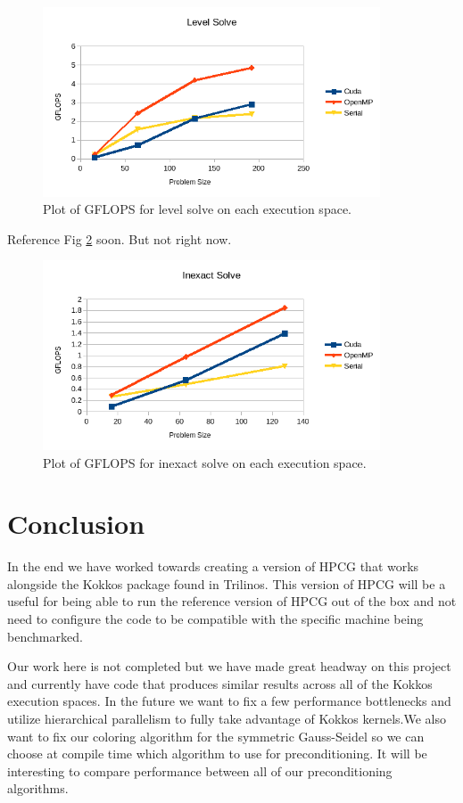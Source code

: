 \documentclass{ccr15}
\begin{document}
\begin{figure}[H]
	\centering
	\includegraphics[width=10cm]{plots/ZAB-LevelSolve.png}
	\caption{Plot of GFLOPS for level solve on each execution space.}
	\label{Level}
\end{figure}

Reference Fig \ref{Inexact} soon. But not right now.

\begin{figure}[H]
	\centering
	\includegraphics[width=10cm]{plots/ZAB-InexactSolve.png}
	\caption{Plot of GFLOPS for inexact solve on each execution space.}
	\label{Inexact}
\end{figure}

\section{Conclusion}
In the end we have worked towards creating a version of HPCG that works alongside the Kokkos
package found in Trilinos. This version of HPCG will be a useful for being able to run the reference
version of HPCG out of the box and not need to configure the code to be compatible with the
specific machine being benchmarked.

Our work here is not completed but we have made great headway on this project and currently have
code that produces similar results across all of the Kokkos execution spaces. In the future we want to
fix a few performance bottlenecks and utilize hierarchical parallelism to fully take advantage of Kokkos
kernels.We also want to fix our coloring algorithm for the symmetric Gauss-Seidel so we can choose at
compile time which algorithm to use for preconditioning. It will be interesting to compare performance
between all of our preconditioning algorithms.
\end{document}
